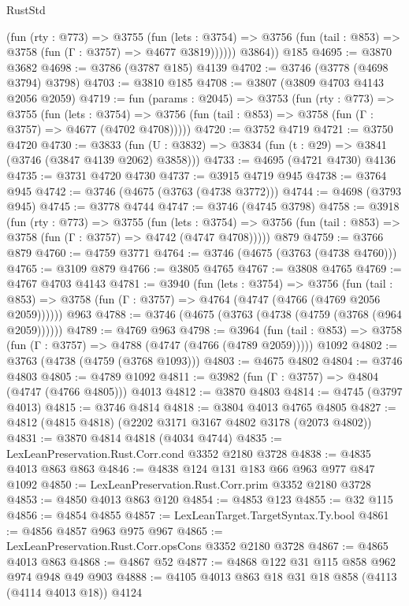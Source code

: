 \begin{lexlean}{RustStd}
\begin{coremodule}
            (fun (rty : @773) =>
            @3755
              (fun (lets : @3754) =>
              @3756 (fun (tail : @853) => @3758 (fun (Γ : @3757) => @4677 @3819))))))
        @3864))
    @185
@4695 := @3870 @3682
@4698 := @3786 (@3787 @185) @4139
@4702 := @3746 (@3778 (@4698 @3794) @3798)
@4703 := @3810 @185
@4708 := @3807 (@3809 @4703 @4143 @2056 @2059)
@4719 := fun (params : @2045) =>
  @3753
    (fun (rty : @773) =>
    @3755
      (fun (lets : @3754) =>
      @3756 (fun (tail : @853) => @3758 (fun (Γ : @3757) => @4677 (@4702 @4708)))))
@4720 := @3752 @4719
@4721 := @3750 @4720
@4730 := @3833 (fun (U : @3832) => @3834 (fun (t : @29) => @3841 (@3746 (@3847 @4139 @2062) @3858)))
@4733 := @4695 (@4721 @4730) @4136
@4735 := @3731 @4720 @4730
@4737 := @3915 @4719 @945
@4738 := @3764 @945
@4742 := @3746 (@4675 (@3763 (@4738 @3772)))
@4744 := @4698 (@3793 @945)
@4745 := @3778 @4744
@4747 := @3746 (@4745 @3798)
@4758 := @3918
    (fun (rty : @773) =>
    @3755
      (fun (lets : @3754) =>
      @3756 (fun (tail : @853) => @3758 (fun (Γ : @3757) => @4742 (@4747 @4708)))))
    @879
@4759 := @3766 @879
@4760 := @4759 @3771
@4764 := @3746 (@4675 (@3763 (@4738 @4760)))
@4765 := @3109 @879
@4766 := @3805 @4765
@4767 := @3808 @4765
@4769 := @4767 @4703 @4143
@4781 := @3940
    (fun (lets : @3754) =>
    @3756
      (fun (tail : @853) => @3758 (fun (Γ : @3757) => @4764 (@4747 (@4766 (@4769 @2056 @2059))))))
    @963
@4788 := @3746 (@4675 (@3763 (@4738 (@4759 (@3768 (@964 @2059))))))
@4789 := @4769 @963
@4798 := @3964
    (fun (tail : @853) => @3758 (fun (Γ : @3757) => @4788 (@4747 (@4766 (@4789 @2059)))))
    @1092
@4802 := @3763 (@4738 (@4759 (@3768 @1093)))
@4803 := @4675 @4802
@4804 := @3746 @4803
@4805 := @4789 @1092
@4811 := @3982 (fun (Γ : @3757) => @4804 (@4747 (@4766 @4805))) @4013
@4812 := @3870 @4803
@4814 := @4745 (@3797 @4013)
@4815 := @3746 @4814
@4818 := @3804 @4013 @4765 @4805
@4827 := @4812 (@4815 @4818) (@2202 @3171 @3167 @4802 @3178 (@2073 @4802))
@4831 := @3870 @4814 @4818 (@4034 @4744)
@4835 := LexLeanPreservation.Rust.Corr.cond @3352 @2180 @3728
@4838 := @4835 @4013 @863 @863
@4846 := @4838 @124 @131 @183 @66 @963 @977 @847 @1092
@4850 := LexLeanPreservation.Rust.Corr.prim @3352 @2180 @3728
@4853 := @4850 @4013 @863 @120
@4854 := @4853 @123
@4855 := @32 @115
@4856 := @4854 @4855
@4857 := LexLeanTarget.TargetSyntax.Ty.bool
@4861 := @4856 @4857 @963 @975 @967
@4865 := LexLeanPreservation.Rust.Corr.opsCons @3352 @2180 @3728
@4867 := @4865 @4013 @863
@4868 := @4867 @52
@4877 := @4868 @122 @31 @115 @858 @962 @974 @948 @49 @903
@4888 := @4105 @4013 @863 @18 @31 @18 @858 (@4113 (@4114 @4013 @18)) @4124

\end{coremodule}
\end{lexlean}
